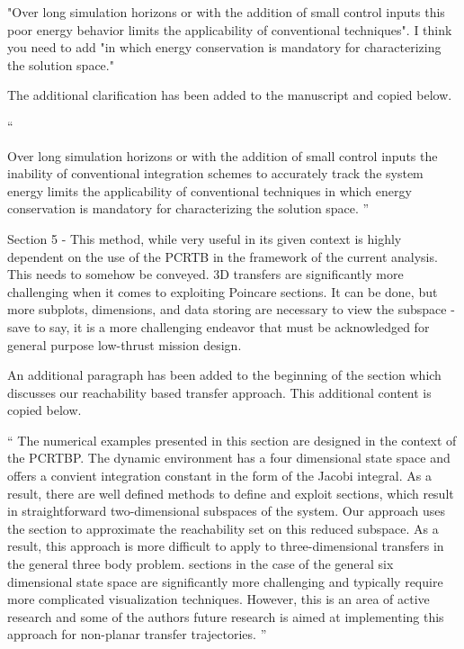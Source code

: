\documentclass[11pt]{article}
\newenvironment{correction}{\begin{list}{}{\setlength{\leftmargin}{1cm}\setlength{\rightmargin}{1cm}}\vspace{\parsep}\item[]``}{''\end{list}}
\begin{document}
\begin{enumerate}
\item 
    \begin{itshape}
"Over long simulation horizons or with the addition of small control inputs this poor energy behavior limits the applicability of conventional techniques".  I think you need to add "in which energy conservation is mandatory for characterizing the solution space."
\end{itshape}

The additional clarification has been added to the manuscript and copied below.
\begin{correction}

Over long simulation horizons or with the addition of small control inputs the inability of conventional integration schemes to accurately track the system energy limits the applicability of conventional techniques in which energy conservation is mandatory for characterizing the solution space.
\end{correction}

\item 
    \begin{itshape}
Section 5 - This method, while very useful in its given context is highly dependent on the use of the PCRTB in the framework of the current analysis.  This needs to somehow be conveyed.  3D transfers are significantly more challenging when it comes to exploiting Poincare sections.  It can be done, but more subplots, dimensions, and data storing are necessary to view the subspace - save to say, it is a more challenging endeavor that must be acknowledged for general purpose low-thrust mission design.
\end{itshape}

An additional paragraph has been added to the beginning of the section which discusses our reachability based transfer approach.
This additional content is copied below.

\begin{correction}
The numerical examples presented in this section are designed in the context of the PCRTBP.
The dynamic environment has a four dimensional state space and offers a convient integration constant in the form of the Jacobi integral.
As a result, there are well defined methods to define and exploit \Poincare sections, which result in straightforward two-dimensional subspaces of the system.
Our approach uses the \Poincare section to approximate the reachability set on this reduced subspace.
As a result, this approach is more difficult to apply to three-dimensional transfers in the general three body problem.
\Poincare sections in the case of the general six dimensional state space are significantly more challenging and typically require more complicated visualization techniques. 
However, this is an area of active research and some of the authors future research is aimed at implementing this approach for non-planar transfer trajectories.
\end{correction}


\end{enumerate}
\end{document}
